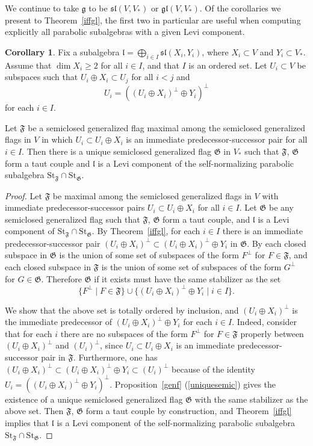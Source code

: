 \documentclass{amsart}
\theoremstyle{definition}
\newtheorem{cor}[theorem]{Corollary}
\theoremstyle{remark}
\numberwithin{equation}{section}
\newcommand {\St} {\mathrm{St}}
\def\gl{\mathfrak {gl}}
\def\g{\mathfrak {g}}
\def\l{\mathfrak {l}}
\def\sl{\mathfrak{sl}}
\def\F{\mathfrak{F}}
\def\G{\mathfrak{G}}
\begin{document}
We continue to take $\g$ to be $\sl(V,V_*)$ or $\gl(V,V_*)$.  Of the corollaries we present to Theorem~\ref{iffgl}, the first two in particular are useful when computing explicitly all parabolic subalgebras with a given Levi component.


\begin{cor} \label{useful}
Fix a subalgebra $\l = \bigoplus_{i \in I} \sl(X_i,Y_i)$, where $X_i \subset V$ and $Y_i \subset V_*$.  Assume that $\dim X_i \geq 2$ for all $i \in I$, and that $I$ is an ordered set.  Let $U_i \subset V$ be subspaces such that $U_i \oplus X_i \subset U_j$ for all $i < j$ and
 $$U_i = ((U_i \oplus X_i)^\perp \oplus Y_i)^\perp$$ 
 for each $i \in I$. 
 
Let $\F$ be a semiclosed generalized flag maximal among the semiclosed generalized flags in $V$ in which $U_i \subset U_i \oplus X_i$ is an immediate predecessor-successor pair for all $i \in I$. Then there is a unique semiclosed generalized flag $\G$ in $V_*$ such that $\F$, $\G$ form a taut couple and $\l$ is a Levi component of the self-normalizing parabolic subalgebra $\St_\F \cap \St_\G$.
\end{cor}

\begin{proof}
Let $\F$ be maximal among the semiclosed generalized flags in $V$ with immediate predecessor-successor pairs $U_i \subset U_i \oplus X_i$ for all $i \in I$.  Let $\G$ be any semiclosed generalized flag such that $\F$, $\G$ form a taut couple, and $\l$ is a Levi component of $\St_\F \cap \St_\G$.
By Theorem~\ref{iffgl},
for each $i \in I$  there is an immediate predecessor-successor pair $(U_i \oplus X_i)^\perp \subset (U_i \oplus X_i)^\perp \oplus Y_i$ in $\G$.   
By \cite[Proposition 3.3]{DP} each closed subspace in $\G$ is the union of some set of subspaces of the form $F^\perp$ for $F \in \F$, and each closed subspace in $\F$ is the union of some set of subspaces of the form $G^\perp$ for $G \in \G$.  Therefore $\G$ if it exists must have the same stabilizer as the set
\begin{equation*}
\{ F^\perp \mid F \in \F \} \cup \{ (U_i \oplus X_i)^\perp \oplus Y_i \mid i \in I \}.
\end{equation*}

We show that the above set is totally ordered by inclusion, and $(U_i \oplus X_i)^\perp$ is the immediate predecessor of $(U_i \oplus X_i)^\perp \oplus Y_i$ for each $i \in I$.   Indeed, consider that for each $i$ there are no subspaces of the form $F^\perp$ for $F \in \F$ properly between $(U_i \oplus X_i)^\perp$ and $(U_i)^\perp$, since $U_i \subset U_i \oplus X_i$ is an immediate predecessor-successor pair in $\F$.  Furthermore, one has $(U_i \oplus X_i)^\perp \subset (U_i \oplus X_i)^\perp \oplus Y_i \subset (U_i)^\perp$ because of the identity $U_i = ((U_i \oplus X_i)^\perp \oplus Y_i)^\perp$.  
Proposition~\ref{genf} (\ref{uniquesemic}) gives the existence of a unique semiclosed generalized flag $\G$ with the same stabilizer as the above set.  Then $\F$, $\G$ form a taut couple by construction, and Theorem~\ref{iffgl} implies that $\l$ is a Levi component of the self-normalizing parabolic subalgebra $\St_\F \cap \St_\G$.
\end{proof}
\end{document}
